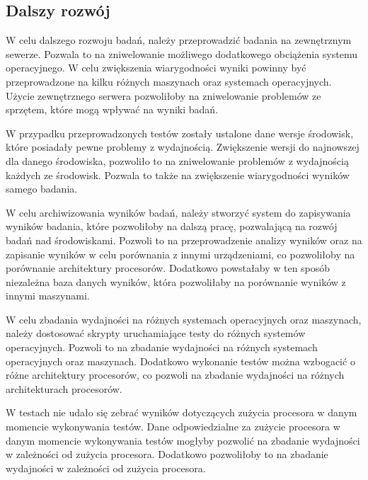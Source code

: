 \subsection{Dalszy rozwój}
W celu dalszego rozwoju badań, należy przeprowadzić badania na zewnętrznym sewerze. Pozwala to na zniwelowanie możliwego dodatkowego obciążenia systemu operacyjnego. W celu zwiększenia wiarygodności wyniki powinny być przeprowadzone na kilku różnych maszynach oraz systemach operacyjnych. Użycie zewnętrznego serwera pozwoliłoby na zniwelowanie problemów ze sprzętem, które mogą wpływać na wyniki badań.

W przypadku przeprowadzonych testów zostały ustalone dane wersje środowisk, które posiadały pewne problemy z wydajnością. Zwiększenie wersji do najnowszej dla danego środowiska, pozwoliło to na zniwelowanie problemów z wydajnością każdych ze środowisk. Pozwala to także na zwiększenie wiarygodności wyników samego badania.

W celu archiwizowania wyników badań, należy stworzyć system do zapisywania wyników badania, które pozwoliłoby na dalszą pracę, pozwalającą na rozwój badań nad środowiskami. Pozwoli to na przeprowadzenie analizy wyników oraz na zapisanie wyników w celu porównania z innymi urządzeniami, co pozwoliłoby na porównanie architektury procesorów. Dodatkowo powstałaby w ten sposób niezależna baza danych wyników, która pozwoliłaby na porównanie wyników z innymi maszynami.

W celu zbadania wydajności na różnych systemach operacyjnych oraz maszynach, należy dostosować skrypty uruchamiające testy do różnych systemów operacyjnych. Pozwoli to na zbadanie wydajności na różnych systemach operacyjnych oraz maszynach. Dodatkowo wykonanie testów można wzbogacić o różne architektury procesorów, co pozwoli na zbadanie wydajności na różnych architekturach procesorów.

W testach nie udało się zebrać wyników dotyczących zużycia procesora w danym momencie wykonywania testów. Dane odpowiedzialne za zużycie procesora w danym momencie wykonywania testów mogłyby pozwolić na zbadanie wydajności w zależności od zużycia procesora. Dodatkowo pozwoliłoby to na zbadanie wydajności w zależności od zużycia procesora.
